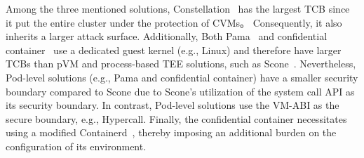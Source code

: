  
Among the three mentioned solutions, Constellation~\cite*{Constellation} has the largest \acrshort{TCB} since it put the entire cluster under the protection of \acrshort{CVM}s。 Consequently, it also inherits a larger attack surface. Additionally, Both Pama~\cite*{Johnson2023ParmaCC} and confidential container~\cite*{confidential_kata} use a dedicated 
guest kernel (e.g., Linux) and therefore have larger \acrshort{TCB}s than pVM and process-based TEE solutions, such as Scone~\cite*{10.5555/3026877.3026930}. Nevertheless, Pod-level solutions (e.g., Pama and confidential container) have a smaller security boundary compared to Scone due to Scone's utilization of the system 
call API as its security boundary. In contrast, Pod-level solutions use the VM-ABI as the secure boundary, e.g., Hypercall. Finally, the confidential container necessitates using a modified Containerd~\cite*{containerd}, thereby imposing an additional burden on the configuration of its environment.



\cleardoublepage

